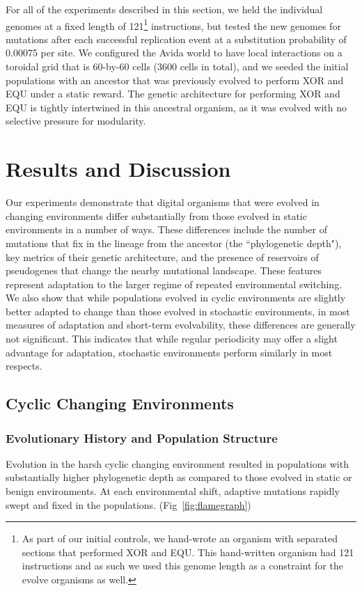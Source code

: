 \documentclass[PhD]{msu-thesis}
\begin{document}
For all of the experiments described in this section, we held the individual genomes at a fixed length of 121\footnote{As part of our initial controls, we hand-wrote an organism with separated sections that performed XOR and EQU. This hand-written organism had 121 instructions and as such we used this genome length as a constraint for the evolve organisms as well.} instructions, but tested the new genomes for mutations after each successful replication event at a substitution probability of 0.00075 per site. We configured the Avida world to have local interactions on a toroidal grid that is 60-by-60 cells (3600 cells in total), and we seeded the initial populations with an ancestor that was previously evolved to perform XOR and EQU under a static reward. The genetic architecture for performing XOR and EQU is tightly intertwined in this ancestral organism, as it was evolved with no selective pressure for modularity.


\section{Results and Discussion}
Our experiments demonstrate that digital organisms that were evolved in changing environments differ substantially from those evolved in static environments in a number of ways. These differences include the number of mutations that fix in the lineage from the ancestor (the ``phylogenetic depth"), key metrics of their genetic architecture, and the presence of reservoirs of pseudogenes that change the nearby mutational landscape. These features represent adaptation to the larger regime of repeated environmental switching. We also show that while populations evolved in cyclic environments are slightly better adapted to change than those evolved in stochastic environments, in most measures of adaptation and short-term evolvability, these differences are generally not significant. This indicates that while regular periodicity may offer a slight advantage for adaptation, stochastic environments perform similarly in most respects. 

\subsection{Cyclic Changing Environments}

\subsubsection{Evolutionary History and Population Structure}
Evolution in the harsh cyclic changing environment resulted in populations with substantially higher phylogenetic depth as compared to those evolved in static or benign environments. At each environmental shift, adaptive mutations rapidly swept and fixed in the populations. (Fig~\ref{fig:flamegraph})
\end{document}
